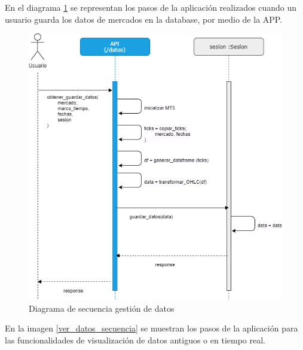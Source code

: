 En el diagrama \ref{gestion_datos} se representan los pasos de la aplicación realizados cuando un usuario guarda los datos de mercados en la database, por medio de la APP.\newline

\begin{figure}[h] 
	\includegraphics[width=1.1\textwidth]{imagenes/diagramas_secuencia/gestion_datos.png}
	\caption{Diagrama de secuencia gestión de datos} \label{gestion_datos}
\end{figure}

En la imagen \ref{ver_datos_secuencia} se muestran los pasos de la aplicación para las funcionalidades de visualización de datos antiguos o en tiempo real.\newline

